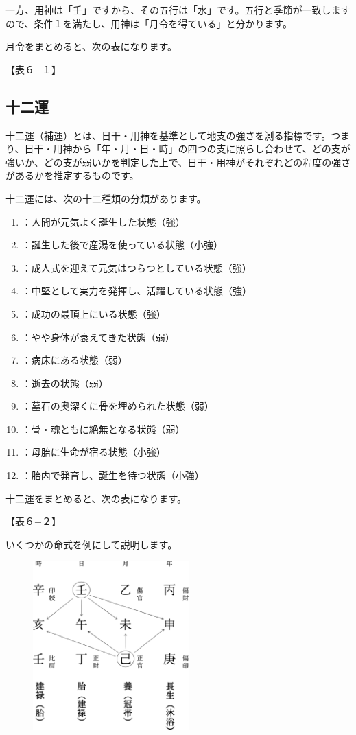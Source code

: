 \documentclass[a5paper,11pt,dvipdfmx]{tarticle}
\begin{document}
一方、用神は「壬」ですから、その五行は「水」です。五行と季節が一致しますので、条件１を満たし、用神は「月令を得ている」と分かります。

月令をまとめると、次の表になります。

【表６−１】

\subsection{十二運}
十二運（補運）とは、日干・用神を基準として地支の強さを測る指標です。つまり、日干・用神から「年・月・日・時」の四つの支に照らし合わせて、どの支が強いか、どの支が弱いかを判定した上で、日干・用神がそれぞれどの程度の強さがあるかを推定するものです。

十二運には、次の十二種類の分類があります。

\begin{enumerate}
\item {}：人間が元気よく誕生した状態（強）
\item {}：誕生した後で産湯を使っている状態（小強）
\item {}：成人式を迎えて元気はつらつとしている状態（強）
\item {}：中堅として実力を発揮し、活躍している状態（強）
\item {}：成功の最頂上にいる状態（強）
\item {}：やや身体が衰えてきた状態（弱）
\item {}：病床にある状態（弱）
\item {}：逝去の状態（弱）
\item {}：墓石の奥深くに骨を埋められた状態（弱）
\item {}：骨・魂ともに絶無となる状態（弱）
\item {}：母胎に生命が宿る状態（小強）
\item {}：胎内で発育し、誕生を待つ状態（小強）
\end{enumerate}

十二運をまとめると、次の表になります。

【表６−２】

いくつかの命式を例にして説明します。

\begin{figure}[h]
  \includegraphics[width=60mm,angle=90]{figs/figure6-4.eps}
\end{figure}
\end{document}

